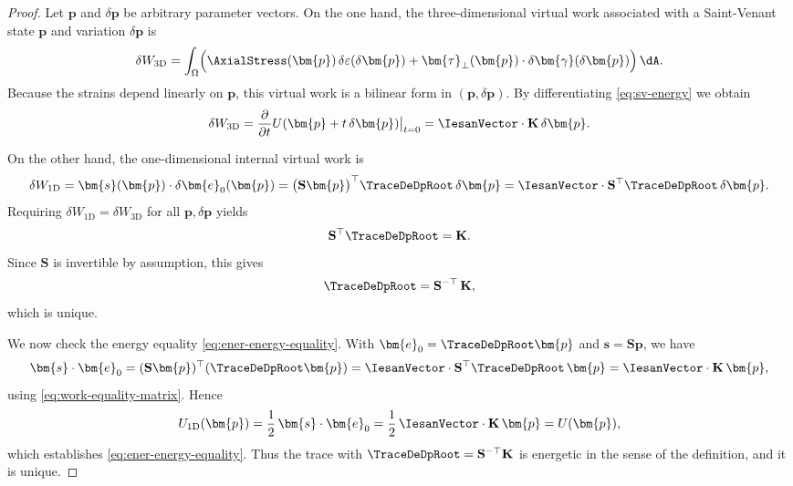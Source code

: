 \begin{proof}
Let $\bm{p}$ and $\delta\bm{p}$ be arbitrary parameter vectors. On the one
hand, the three-dimensional virtual work associated with a Saint-Venant state
$\bm{p}$ and variation $\delta\bm{p}$ is
\begin{equation*}
\delta W_{\mathrm{3D}}
=
\int_\Omega \Bigl(
\AxialStress(\bm{p})\,\delta\varepsilon(\delta\bm{p})
+
\bm{\tau}_\perp(\bm{p})\cdot\delta\bm{\gamma}(\delta\bm{p})
\Bigr)\,\dA.
\end{equation*}
Because the strains depend linearly on $\bm{p}$, this virtual work is a
bilinear form in $(\bm{p},\delta\bm{p})$. By differentiating
\eqref{eq:sv-energy} we obtain
\begin{equation}
\delta W_{\mathrm{3D}}
=
\frac{\partial}{\partial t}
U(\bm{p}+t\,\delta\bm{p})\big|_{t=0}
=
\IesanVector\cdot \mathbf{K}\,\delta\bm{p}.
\label{eq:3D-work-K}
\end{equation}

On the other hand, the one-dimensional internal virtual work is
\begin{equation}
\delta W_{\mathrm{1D}}
=
\bm{s}(\bm{p})\cdot \delta\bm{e}_0(\bm{p})
=
\bigl(\mathbf{S}\bm{p}\bigr)^\top
\TraceDeDpRoot\,\delta\bm{p}
=
\IesanVector\cdot \mathbf{S}^\top \TraceDeDpRoot\,\delta\bm{p}.
\label{eq:1D-work-T0}
\end{equation}
Requiring $\delta W_{\mathrm{1D}}=\delta W_{\mathrm{3D}}$ for all
$\bm{p},\delta\bm{p}$ yields
\begin{equation}
\mathbf{S}^\top \TraceDeDpRoot = \mathbf{K}.
\label{eq:work-equality-matrix}
\end{equation}
Since $\mathbf{S}$ is invertible by assumption, this gives
\begin{equation}
\TraceDeDpRoot = \mathbf{S}^{-\top}\,\mathbf{K},
\end{equation}
which is unique.

We now check the energy equality \eqref{eq:ener-energy-equality}. With
$\bm{e}_0 = \TraceDeDpRoot\bm{p}$ and $\bm{s}=\mathbf{S}\bm{p}$, we have
\begin{equation*}
\bm{s}\cdot\bm{e}_0
=
(\mathbf{S}\bm{p})^\top(\TraceDeDpRoot\bm{p})
=
\IesanVector\cdot \mathbf{S}^\top \TraceDeDpRoot\,\bm{p}
=
\IesanVector\cdot \mathbf{K}\,\bm{p},
\end{equation*}
using \eqref{eq:work-equality-matrix}. Hence
\begin{equation*}
U_{\mathrm{1D}}(\bm{p})
=
\frac{1}{2}\,\bm{s}\cdot\bm{e}_0
=
\frac{1}{2}\,\IesanVector\cdot \mathbf{K}\,\bm{p}
=
U(\bm{p}),
\end{equation*}
which establishes \eqref{eq:ener-energy-equality}. Thus the trace with
$\TraceDeDpRoot = \mathbf{S}^{-\top}\mathbf{K}$ is energetic in the sense of the
definition, and it is unique.
\end{proof}

